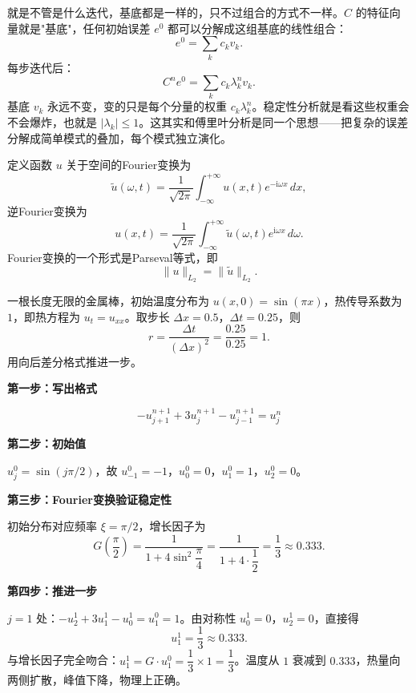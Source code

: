 \begin{dxtips}
就是不管是什么迭代，基底都是一样的，只不过组合的方式不一样。$C$ 的特征向量就是"基底"，任何初始误差 $e^0$ 都可以分解成这组基底的线性组合：
$$e^0 = \sum_k c_k v_k.$$
每步迭代后：
$$C^n e^0 = \sum_k c_k \lambda_k^n v_k.$$
基底 $v_k$ 永远不变，变的只是每个分量的权重 $c_k \lambda_k^n$。稳定性分析就是看这些权重会不会爆炸，也就是 $|\lambda_k| \leq 1$。这其实和傅里叶分析是同一个思想——把复杂的误差分解成简单模式的叠加，每个模式独立演化。
\end{dxtips}
\begin{definition}[Fourier方法]
定义函数 $u$ 关于空间的Fourier变换为
$$\tilde{u}(\omega,t) = \frac{1}{\sqrt{2\pi}}\int_{-\infty}^{+\infty} u(x,t)e^{-\mathrm{i}\omega x}\,dx,$$
逆Fourier变换为
$$u(x,t) = \frac{1}{\sqrt{2\pi}}\int_{-\infty}^{+\infty} \tilde{u}(\omega,t)e^{\mathrm{i}\omega x}\,d\omega.$$
Fourier变换的一个形式是Parseval等式，即
$$\|u\|_{L_2} = \|\tilde{u}\|_{L_2}.$$
\end{definition}
\begin{example}[热传导方程的向后差分格式稳定性验证]
一根长度无限的金属棒，初始温度分布为 $u(x,0) = \sin(\pi x)$，热传导系数为 $1$，即热方程为 $u_t = u_{xx}$。取步长 $\Delta x = 0.5$，$\Delta t = 0.25$，则
$$r = \frac{\Delta t}{(\Delta x)^2} = \frac{0.25}{0.25} = 1.$$
用向后差分格式推进一步。

\textbf{第一步：写出格式}

$$-u_{j+1}^{n+1} + 3u_j^{n+1} - u_{j-1}^{n+1} = u_j^n$$

\textbf{第二步：初始值}

$u_j^0 = \sin(j\pi/2)$，故 $u_{-1}^0 = -1$，$u_0^0 = 0$，$u_1^0 = 1$，$u_2^0 = 0$。

\textbf{第三步：Fourier变换验证稳定性}

初始分布对应频率 $\xi = \pi/2$，增长因子为
$$G\!\left(\frac{\pi}{2}\right) = \frac{1}{1 + 4\sin^2\dfrac{\pi}{4}} = \frac{1}{1+4\cdot\dfrac{1}{2}} = \frac{1}{3} \approx 0.333.$$

\textbf{第四步：推进一步}

$j=1$ 处：$-u_2^1 + 3u_1^1 - u_0^1 = u_1^0 = 1$。由对称性 $u_0^1 = 0$，$u_2^1 = 0$，直接得
$$u_1^1 = \frac{1}{3} \approx 0.333.$$
与增长因子完全吻合：$u_1^1 = G \cdot u_1^0 = \dfrac{1}{3} \times 1 = \dfrac{1}{3}$。温度从 $1$ 衰减到 $0.333$，热量向两侧扩散，峰值下降，物理上正确。
\end{example}
